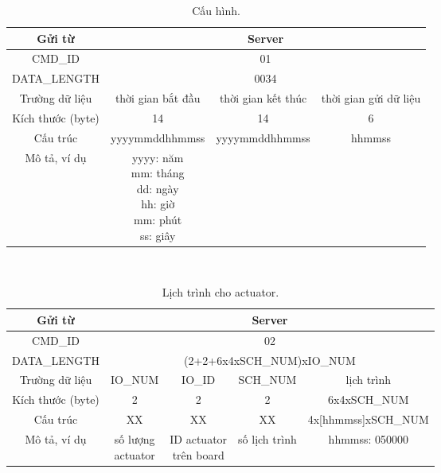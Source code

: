 \documentclass[a4paper,12pt,oneside]{article}
\begin{document}
\begin{table}[H]
\centering
\begin{tabular}{|c|c|c|c|}
\hline 
Gửi từ & \multicolumn{3}{c|}{Server} \\ 
\hline 
CMD\_ID & \multicolumn{3}{c|}{01} \\ 
\hline 
DATA\_LENGTH & \multicolumn{3}{c|}{0034} \\ 
\hline 
Trường dữ liệu & thời gian bắt đầu & thời gian kết thúc & thời gian gửi dữ liệu \\ 
\hline 
Kích thước (byte) & 14 & 14 & 6 \\ 
\hline 
Cấu trúc & yyyymmddhhmmss & yyyymmddhhmmss & hhmmss \\ 
\hline 
Mô tả, ví dụ & \makecell{yyyy: năm \\
mm: tháng \\ dd: ngày \\ hh: giờ \\ mm: phút \\ ss: giây} &  &  \\ 
\hline 
\end{tabular} 
\caption{Cấu hình.}
\end{table}
\noindent \\
\begin{table}[H]
\centering
\begin{tabular}{|c|c|c|c|c|}
\hline 
Gửi từ & \multicolumn{4}{c|}{Server} \\ 
\hline 
CMD\_ID & \multicolumn{4}{c|}{02} \\ 
\hline 
DATA\_LENGTH & \multicolumn{4}{c|}{(2+2+6x4xSCH\_NUM)xIO\_NUM}\\ 
\hline 
Trường dữ liệu & IO\_NUM & IO\_ID & SCH\_NUM & lịch trình \\ 
\hline 
Kích thước (byte) & 2 & 2 & 2 & 6x4xSCH\_NUM \\ 
\hline 
Cấu trúc & XX & XX & XX & 4x[hhmmss]xSCH\_NUM \\ 
\hline 
Mô tả, ví dụ & \makecell{số lượng \\actuator} & \makecell{ID actuator \\ trên board} & số lịch trình & hhmmss: 050000 \\ 
\hline 
\end{tabular} 
\caption{Lịch trình cho actuator.}
\end{table}
\noindent \\
\end{document}
